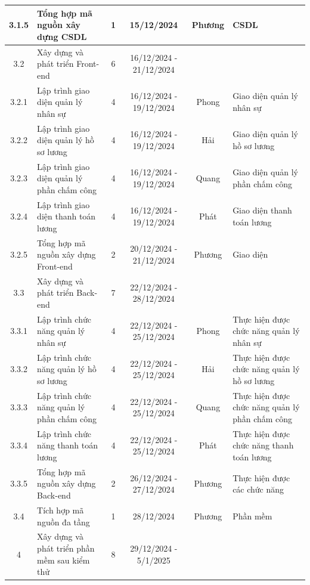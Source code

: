 \begin{longtable}{|c|p{3cm}|c|c|c|p{2.8cm}|}
    3.1.5 & Tổng hợp mã nguồn xây dựng CSDL & 1 & 15/12/2024 & Phương & CSDL \\ \hline
    3.2 & Xây dựng và phát triển Front-end & 6 & 16/12/2024 - 21/12/2024 & \hspace{0pt} & \hspace{0pt}\\ \hline
    3.2.1 & Lập trình giao diện quản lý nhân sự & 4 & 16/12/2024 - 19/12/2024 & Phong & Giao diện quản lý nhân sự \\ \hline
    3.2.2 & Lập trình giao diện quản lý hồ sơ lương & 4 & 16/12/2024 - 19/12/2024 & Hải & Giao diện quản lý hồ sơ lương \\ \hline
    3.2.3 & Lập trình giao diện quản lý phần chấm công & 4 & 16/12/2024 - 19/12/2024 & Quang & Giao diện quản lý phần chấm công \\ \hline
    3.2.4 & Lập trình giao diện thanh toán lương & 4 & 16/12/2024 - 19/12/2024 & Phát & Giao diện thanh toán lương \\ \hline
    3.2.5 & Tổng hợp mã nguồn xây dựng Front-end & 2 & 20/12/2024 - 21/12/2024 & Phương & Giao diện \\ \hline
    3.3 & Xây dựng và phát triển Back-end & 7 & 22/12/2024 - 28/12/2024 & \hspace{0pt} & \hspace{0pt}\\ \hline
    3.3.1 & Lập trình chức năng quản lý nhân sự & 4 & 22/12/2024 - 25/12/2024 & Phong & Thực hiện được chức năng quản lý nhân sự \\ \hline
    3.3.2 & Lập trình chức năng quản lý hồ sơ lương & 4 & 22/12/2024 - 25/12/2024 & Hải & Thực hiện được chức năng quản lý hồ sơ lương \\ \hline
    3.3.3 & Lập trình chức năng quản lý phần chấm công & 4 & 22/12/2024 - 25/12/2024 & Quang & Thực hiện được chức năng quản lý phần chấm công \\ \hline
    3.3.4 & Lập trình chức năng thanh toán lương & 4 & 22/12/2024 - 25/12/2024 & Phát & Thực hiện được chức năng thanh toán lương \\ \hline
    3.3.5 & Tổng hợp mã nguồn xây dựng Back-end & 2 & 26/12/2024 - 27/12/2024 & Phương & Thực hiện được các chức năng \\ \hline
    3.4 & Tích hợp mã nguồn đa tầng & 1 & 28/12/2024 & Phương & Phần mềm \\ \hline
    4 & Xây dựng và phát triển phần mềm sau kiểm thử & 8 & 29/12/2024 - 5/1/2025 & \hspace{0pt} & \hspace{0pt}\\ \hline

\end{longtable}
